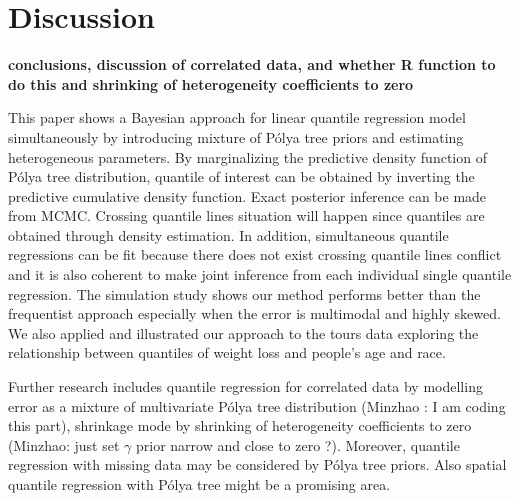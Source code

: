 \documentclass[12pt]{article}
\newcommand{\polya}{P\'{o}lya}
\begin{document}
\section{Discussion}
{\bf conclusions, discussion of correlated data, and whether R
  function to do this and shrinking of heterogeneity coefficients to zero}

This paper shows a Bayesian approach for linear quantile regression
model simultaneously by introducing mixture of \polya{} tree
priors and estimating heterogeneous parameters. By marginalizing the
predictive density function of \polya{} tree distribution, quantile
of interest can be obtained by inverting the predictive cumulative
density function. Exact posterior inference can be made from
MCMC. Crossing quantile lines situation will happen since
quantiles are obtained through density estimation. In addition,
simultaneous quantile regressions can be fit because there does not
exist crossing quantile lines conflict and it is also coherent to make
joint inference  from each individual single quantile regression. The
simulation study shows our method performs better than the frequentist
approach especially when the error is multimodal and highly skewed. We
also applied and illustrated our approach to the tours data exploring
the relationship between  quantiles of weight loss and people's age
and race. 

Further research includes quantile regression for correlated data by
modelling error as a mixture of multivariate \polya{} tree
distribution (Minzhao : I am coding this part), shrinkage mode by
shrinking of heterogeneity coefficients to zero (Minzhao: just set
$\gamma$ prior narrow and  close to zero ?). Moreover, quantile
regression with missing data may be considered by \polya{} tree
priors. Also spatial quantile regression with \polya{} tree might be
a promising area. 


% 

\end{document}
